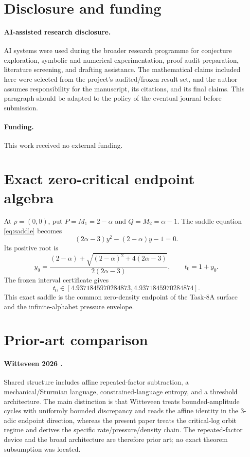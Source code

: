 \documentclass[11pt]{amsart}
\begin{document}
\section*{Disclosure and funding}

\paragraph{AI-assisted research disclosure.}
AI systems were used during the broader research programme for conjecture exploration, symbolic and numerical experimentation, proof-audit preparation, literature screening, and drafting assistance.  The mathematical claims included here were selected from the project's audited/frozen result set, and the author assumes responsibility for the manuscript, its citations, and its final claims.  This paragraph should be adapted to the policy of the eventual journal before submission.

\paragraph{Funding.}
This work received no external funding.

\appendix

\section{Exact zero-critical endpoint algebra}

At \(\rho=(0,0)\), put \(P=M_1=2-\alpha\) and \(Q=M_2=\alpha-1\).  The saddle equation \eqref{eq:saddle} becomes
\[
 (2\alpha-3)y^2-(2-\alpha)y-1=0.
\]
Its positive root is
\[
 y_0=
 \frac{(2-\alpha)+
 \sqrt{(2-\alpha)^2+4(2\alpha-3)}}
 {2(2\alpha-3)},
\qquad
 t_0=1+y_0.
\]
The frozen interval certificate gives
\[
 t_0\in
 [4.9371845970284873,
  4.9371845970284874].
\]
This exact saddle is the common zero-density endpoint of the Task-8A surface and the infinite-alphabet pressure envelope.

\section{Prior-art comparison}

\paragraph{Witteveen 2026 \cite{Witteveen2026}.}
Shared structure includes affine repeated-factor subtraction, a mechanical/Sturmian language, constrained-language entropy, and a threshold architecture.  The main distinction is that Witteveen treats bounded-amplitude cycles with uniformly bounded discrepancy and reads the affine identity in the \(3\)-adic endpoint direction, whereas the present paper treats the critical-log orbit regime and derives the specific rate/pressure/density chain.  The repeated-factor device and the broad architecture are therefore prior art; no exact theorem subsumption was located.
\end{document}

